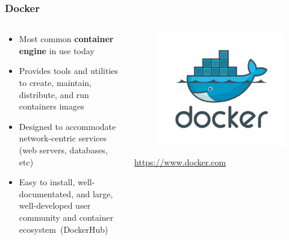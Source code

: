 \documentclass{beamer}
\begin{document}
\begin{frame}
   \frametitle{Docker}
   \begin{columns}
      \begin{column}{0.6\textwidth}
         \begin{itemize}
            \setlength\itemsep{1.0em}
            \item Most common \textbf{container engine} in use today  
            \item Provides tools and utilities to create, maintain, 
               distribute, and run containers images
            \item Designed to accommodate network-centric services (web 
               servers, databases, etc)
            \item Easy to install, well-documentated, and large, 
               well-developed user community and container 
               ecosystem~(DockerHub)
         \end{itemize}
      \end{column}
      \hfill
      \begin{column}{0.5\textwidth}
         \begin{figure}[htbp]
            \includegraphics[width=1.0\textwidth]{images/docker-logo.png}
         \end{figure}
         \begin{center}
            \url{https://www.docker.com}
         \end{center}
      \end{column}
   \end{columns}
\end{frame}
\end{document}
